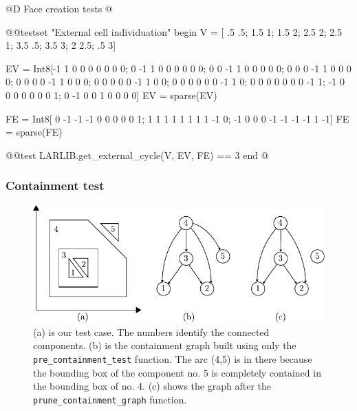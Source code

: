 @D Face creation tests
@{@@testset "External cell individuation" begin
    V = [ .5 .5;  1.5   1;  1.5  2; 
         2.5  2;  2.5   1;  3.5 .5;
         3.5  3;    2 2.5;   .5  3]

    EV = Int8[-1  1  0  0  0  0  0  0  0;
               0 -1  1  0  0  0  0  0  0;
               0  0 -1  1  0  0  0  0  0;
               0  0  0 -1  1  0  0  0  0;
               0  0  0  0 -1  1  0  0  0;
               0  0  0  0  0 -1  1  0  0;
               0  0  0  0  0  0 -1  1  0;
               0  0  0  0  0  0  0 -1  1;
              -1  0  0  0  0  0  0  0  1;
               0 -1  0  0  1  0  0  0  0]
    EV = sparse(EV)
    
    FE = Int8[ 0 -1 -1 -1  0  0  0  0  0  1;
               1  1  1  1  1  1  1  1 -1  0;
              -1  0  0  0 -1 -1 -1 -1  1 -1]
    FE = sparse(FE)

    @@test LARLIB.get_external_cycle(V, EV, FE) == 3
end
@}

\subsubsection{Containment test}
\label{sec:conttest_test}

\begin{figure}[h]
    \centering
    \includegraphics{./img/ch2-containmenttest.pdf}
    \caption{(a) is our test case. The numbers identify the connected components. 
        (b) is the containment graph built using only the \texttt{pre\_containment\_test} 
        function. The arc (4,5) is in there because the bounding box of the component 
        no. 5 is completely contained in the bounding box of no. 4. (c) shows 
        the graph after the \texttt{prune\_containment\_graph} function.}
\end{figure}

